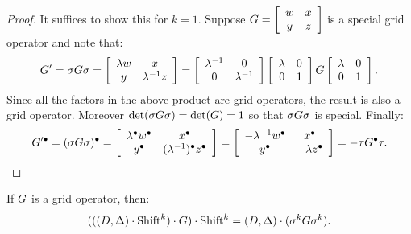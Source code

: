 \begin{proof}
It suffices to show this for $k=1$. Suppose $G=\left[ \begin{array} {cc} 
w & x \\
y & z
\end{array} \right]$ is a special grid operator and note that:
\[
G'=
\sigma G \sigma=
\left[ \begin{array} {cc} 
\lambda w & x \\
y & \lambda^{-1}z
\end{array} \right]
=
\left[ \begin{array} {cc} 
\lambda^{-1} & 0 \\
0 & \lambda^{-1}
\end{array} \right]
\left[ \begin{array} {cc} 
\lambda & 0 \\
0 & 1
\end{array} \right]
G
\left[ \begin{array} {cc} 
\lambda  & 0 \\
0 & 1
\end{array} \right].
\]
Since all the factors in the above product are grid operators, the result is also a grid operator. Moreover $\mbox{det}(\sigma G\sigma)=\mbox{det}(G)=1$ so that $\sigma G\sigma$ is special. Finally:
\[
G'^\bullet=(\sigma G \sigma)^\bullet=
\left[ \begin{array} {cc} 
\lambda^\bullet w^\bullet & x^\bullet \\
y^\bullet & (\lambda^{-1})^\bullet z^\bullet
\end{array} \right]
=
\left[ \begin{array} {cc} 
-\lambda^{-1} w^\bullet & x^\bullet \\
y^\bullet & -\lambda z^\bullet
\end{array} \right]
=
-\tau G^\bullet \tau.
\]
\end{proof}

\begin{lemma}
\label{conjugationbysigma2}
If $G$ is a grid operator, then:
\[
(((D,\Delta)\cdot \mbox{Shift}^k) \cdot G )\cdot \mbox{Shift}^k = (D,\Delta) \cdot (\sigma^k G\sigma^k).
\]
\end{lemma}

